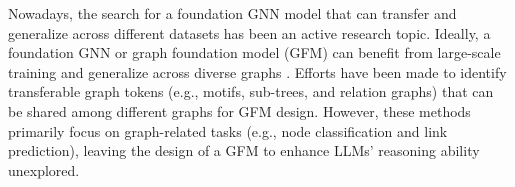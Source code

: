 Nowadays, the search for a foundation GNN model that can transfer and generalize across different datasets has been an active research topic. Ideally, a foundation GNN or graph foundation model (GFM) can benefit from large-scale training and generalize across diverse graphs \citep{maoposition,liu2025graph}. Efforts have been made to identify transferable graph tokens (e.g., motifs, sub-trees, and relation graphs) \citep{galkintowards,wang2024gft,xia2024opengraph} that can be shared among different graphs for GFM design. However, these methods primarily focus on graph-related tasks (e.g., node classification and link prediction), leaving the design of a GFM to enhance LLMs' reasoning ability unexplored.


